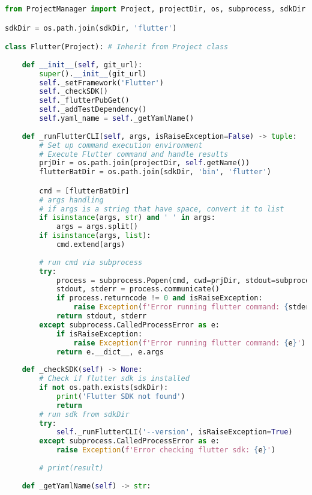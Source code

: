 \begin{lstlisting}[language=Python, caption={$\texttt{Flutter}$ class - subclass of Project.}, label={lst:2}]
from ProjectManager import Project, projectDir, os, subprocess, sdkDir

sdkDir = os.path.join(sdkDir, 'flutter')

class Flutter(Project): # Inherit from Project class
    
    def __init__(self, git_url):
        super().__init__(git_url)
        self._setFramework('Flutter')
        self._checkSDK()
        self._flutterPubGet()
        self._addTestDependency()
        self.yaml_name = self._getYamlName()
        
    def _runFlutterCLI(self, args, isRaiseException=False) -> tuple:
        # Set up command execution environment
        # Execute Flutter command and handle results
        prjDir = os.path.join(projectDir, self.getName())
        flutterBatDir = os.path.join(sdkDir, 'bin', 'flutter')

        cmd = [flutterBatDir]
        # args handling
        # if args is a string that have space, convert it to list
        if isinstance(args, str) and ' ' in args:
            args = args.split()
        if isinstance(args, list):
            cmd.extend(args)
            
        # run cmd via subprocess
        try:
            process = subprocess.Popen(cmd, cwd=prjDir, stdout=subprocess.PIPE, stderr=subprocess.PIPE, universal_newlines=True, encoding='utf-8', shell=True)
            stdout, stderr = process.communicate()
            if process.returncode != 0 and isRaiseException:
                raise Exception(f'Error running flutter command: {stderr}')
            return stdout, stderr
        except subprocess.CalledProcessError as e:
            if isRaiseException:
                raise Exception(f'Error running flutter command: {e}')
            return e.__dict__, e.args
    
    def _checkSDK(self) -> None:
        # Check if flutter sdk is installed
        if not os.path.exists(sdkDir):
            print('Flutter SDK not found')
            return
        # run sdk from sdkDir
        try:
            self._runFlutterCLI('--version', isRaiseException=True)
        except subprocess.CalledProcessError as e:
            raise Exception(f'Error checking flutter sdk: {e}')
        
        # print(result)
    
    def _getYamlName(self) -> str:


\end{lstlisting}

